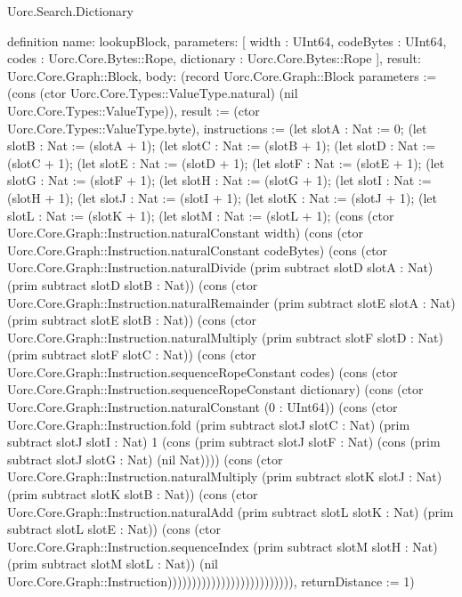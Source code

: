 \begin{lexlean}{Uorc.Search.Dictionary}
\begin{semanticmodule}
definition{
  name: lookupBlock,
  parameters: [
    width : UInt64,
    codeBytes : UInt64,
    codes : Uorc.Core.Bytes::Rope,
    dictionary : Uorc.Core.Bytes::Rope
  ],
  result: Uorc.Core.Graph::Block,
  body: (record Uorc.Core.Graph::Block {parameters := (cons (ctor Uorc.Core.Types::ValueType.natural) (nil Uorc.Core.Types::ValueType)), result := (ctor Uorc.Core.Types::ValueType.byte), instructions := (let slotA : Nat := 0; (let slotB : Nat := (slotA + 1); (let slotC : Nat := (slotB + 1); (let slotD : Nat := (slotC + 1); (let slotE : Nat := (slotD + 1); (let slotF : Nat := (slotE + 1); (let slotG : Nat := (slotF + 1); (let slotH : Nat := (slotG + 1); (let slotI : Nat := (slotH + 1); (let slotJ : Nat := (slotI + 1); (let slotK : Nat := (slotJ + 1); (let slotL : Nat := (slotK + 1); (let slotM : Nat := (slotL + 1); (cons (ctor Uorc.Core.Graph::Instruction.naturalConstant width) (cons (ctor Uorc.Core.Graph::Instruction.naturalConstant codeBytes) (cons (ctor Uorc.Core.Graph::Instruction.naturalDivide (prim subtract slotD slotA : Nat) (prim subtract slotD slotB : Nat)) (cons (ctor Uorc.Core.Graph::Instruction.naturalRemainder (prim subtract slotE slotA : Nat) (prim subtract slotE slotB : Nat)) (cons (ctor Uorc.Core.Graph::Instruction.naturalMultiply (prim subtract slotF slotD : Nat) (prim subtract slotF slotC : Nat)) (cons (ctor Uorc.Core.Graph::Instruction.sequenceRopeConstant codes) (cons (ctor Uorc.Core.Graph::Instruction.sequenceRopeConstant dictionary) (cons (ctor Uorc.Core.Graph::Instruction.naturalConstant (0 : UInt64)) (cons (ctor Uorc.Core.Graph::Instruction.fold (prim subtract slotJ slotC : Nat) (prim subtract slotJ slotI : Nat) 1 (cons (prim subtract slotJ slotF : Nat) (cons (prim subtract slotJ slotG : Nat) (nil Nat)))) (cons (ctor Uorc.Core.Graph::Instruction.naturalMultiply (prim subtract slotK slotJ : Nat) (prim subtract slotK slotB : Nat)) (cons (ctor Uorc.Core.Graph::Instruction.naturalAdd (prim subtract slotL slotK : Nat) (prim subtract slotL slotE : Nat)) (cons (ctor Uorc.Core.Graph::Instruction.sequenceIndex (prim subtract slotM slotH : Nat) (prim subtract slotM slotL : Nat)) (nil Uorc.Core.Graph::Instruction)))))))))))))))))))))))))), returnDistance := 1})
}


\end{semanticmodule}
\end{lexlean}

